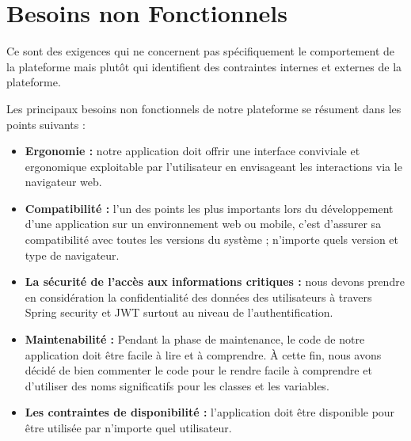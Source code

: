 \section{	Besoins non Fonctionnels}
\hspace{4mm}Ce sont des exigences qui ne concernent pas spécifiquement le comportement de la plateforme mais plutôt qui identifient des contraintes internes et externes de la plateforme. 
\par Les principaux besoins non fonctionnels de notre plateforme se résument dans les points suivants :
\begin{itemize}
    \item \textbf{	Ergonomie : }notre application doit offrir une interface conviviale et ergonomique exploitable par l'utilisateur en envisageant les interactions via le navigateur web.
    \item \textbf{	Compatibilité : }l’un des points les plus importants lors du développement d’une application sur un environnement web ou mobile, c’est d’assurer sa compatibilité avec toutes les versions du système ; n’importe quels version et type de navigateur.
    \item \textbf{	La sécurité de l’accès aux informations critiques : }nous devons prendre en considération la confidentialité des données des utilisateurs à travers Spring security et JWT surtout au niveau de l’authentification.
    \item \textbf{	Maintenabilité : }Pendant la phase de maintenance, le code de notre application doit être facile à lire et à comprendre. À cette fin, nous avons décidé de bien commenter le code pour le rendre facile à comprendre et d’utiliser des noms significatifs pour les classes et les variables.
    \item \textbf{	Les contraintes de disponibilité : }l’application doit être disponible pour être utilisée par n’importe quel utilisateur.
\end{itemize}
